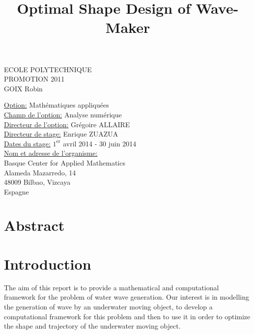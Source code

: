 \documentclass[11pt,a4paper]{article}
\title{Optimal Shape Design of Wave-Maker}
\date{}
\begin{document}
\begin{minipage}{15cm}
	\begin{minipage}{7cm}
		ECOLE POLYTECHNIQUE \\
		PROMOTION 2011 \\ 
		GOIX Robin
	\end{minipage}
	\vspace{5\baselineskip}
	\maketitle
	\center\makebox[15cm]{\textbf\dotfill}
	\vspace{1\baselineskip}
	\vspace{6\baselineskip}
	\begin{flushleft}
		\underline{Option:} Mathématiques appliquées
		\vspace{.4\baselineskip}\\
		\underline{Champ de l'option:} Analyse numérique
		\vspace{.4\baselineskip}\\
		\underline{Directeur de l'option:} Grégoire ALLAIRE
		\vspace{.4\baselineskip}\\
		\underline{Directeur de stage:} Enrique ZUAZUA
		\vspace{.4\baselineskip}\\
		\underline{Dates du stage:} 	$\mbox{1}^{\mbox{er}}$ avril 2014 - 30 juin 2014
		\vspace{.4\baselineskip}\\
		\underline{Nom et adresse de l'organisme:}\\
		Basque Center for Applied Mathematics\\
		Alameda Mazarredo, 14\\
		48009 Bilbao, Vizcaya\\
		Espagne
	\end{flushleft}
\end{minipage}

\pagebreak

\tableofcontents
{}

\pagebreak

\section*{Abstract}



\section*{Introduction}
	The aim of this report is to provide a mathematical and computational framework for the problem of water wave generation. Our interest is in modelling the generation of wave by an underwater moving object, to develop a computational framework for this problem and then to use it in order to optimize the shape and trajectory of the underwater moving object.
		
\end{document}
